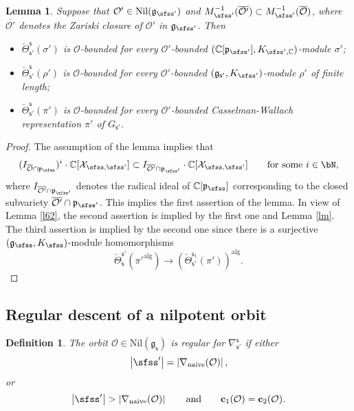 \documentclass[12pt,a4paper]{amsart}
\def\abs#1{\left|{#1}\right|}
\newcommand{\CO}{{\mathcal {O}}}
\newcommand{\CX}{{\mathcal {X}}}
\newcommand{\g}{\mathfrak g}
\newcommand{\p}{\mathfrak p}
\def\DD{\nabla}
\numberwithin{equation}{section}
\newtheorem{lem}[thm]{Lemma}
\newtheorem{defn}[thm]{Definition}
\theoremstyle{remark}
\begin{document}
\begin{lem}\label{comobound}
Suppose that $\CO'\in \mathrm{Nil}(\g_{\sfss'})$ and  $M_{\sfss'}^{-1}(\overline{\CO'})\subset M_{\sfss'}^{-1}(\overline{\CO})$, where  $\overline{\CO'}$ denotes the Zariski closure of $\CO'$ in $\g_{\sfss'}$.  Then 
\begin{itemize}
\item
$\check \Theta_{\mathsf s'}^{\mathsf s}(\sigma')$ is $\CO$-bounded for every $\CO'$-bounded $(\C[\p_{\sfss'}], K_{\sfss', \C})$-module $\sigma'$;
\item
 $\check \Theta_{\mathsf s'}^{\mathsf s}(\rho')$ is $\CO$-bounded for every $\CO'$-bounded $(\g_{\mathsf s'}, K_{\sfss'})$-module $\rho'$ of finite length;
 \item $\check \Theta_{\mathsf s'}^{\mathsf s}(\pi')$ is $\CO$-bounded for every $\CO'$-bounded Casselman-Wallach representation $\pi'$ of $G_{\mathsf s'}$.
 \end{itemize}
\end{lem}
\begin{proof} The assumption of the lemma implies  that 
\[
 ( I_{\overline{\CO}\cap \p_\sfss})^i\cdot \C[\CX_{\sfss, \sfss'}] \subset I_{\overline{\CO'}\cap \p_{\sfss'}}\cdot  \C[\CX_{\sfss, \sfss'}]\qquad \textrm{for some } i\in \bN,
\]
where $I_{\overline{\CO'}\cap \p_{\sfss'}}$ denotes  the radical ideal of $\C[\p_\sfss]$ corresponding to the closed subvariety $\overline{\CO'}\cap \p_{\sfss'}$.
This implies the first assertion of the lemma. In view of Lemma \ref{l62}, the second assertion is implied by the first one and Lemma \ref{lm}. The third assertion is implied by the second one since there is a surjective 
$(\g_{\sfss}, K_{\sfss})$-module homomorphisms
\[
\check \Theta_{\mathsf s}^{\mathsf s'}(\pi'^{\mathrm{alg}})\rightarrow \left (\check \Theta_{\mathsf s'}^{\mathsf s_1}(\pi')\right )^{\mathrm{alg}}.
 \]

\end{proof}


\subsection{Regular descent of a nilpotent orbit}\label{regud}

\begin{defn}
The orbit $\CO\in \mathrm{Nil}(\g_\mathsf s)$ is regular for $\DD_{\mathsf s'}^{\mathsf s}$ if
either
\[
\abs{\sfss'}=\abs{\DD_\mathrm{naive}(\CO)},
\]
 or
 \[
 \abs{\sfss'}>\abs{\DD_\mathrm{naive}(\CO)}\qquad\textrm{and}\qquad \mathbf c_1(\CO)=\mathbf c_2(\CO).
\]

\end{defn}
\end{document}
